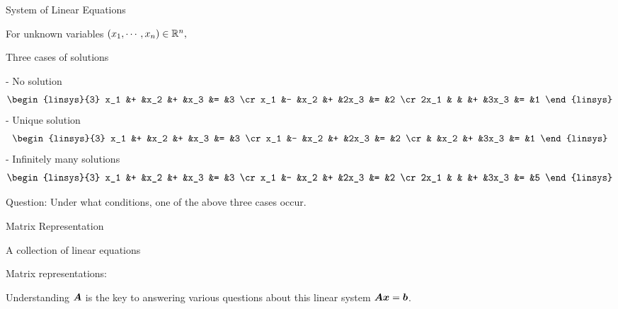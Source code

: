 \documentclass[handout,fleqn,aspectratio=169]{beamer}
\begin{document}
\begin{frame}{System of Linear Equations}

\plitemsep 0.1in


\bci 
\item For unknown variables $(x_1, \cdots, x_n) \in {\mathbb R}^n,$

\item Three cases of solutions

{
- No solution
$$
\begin{linsys}{3}
x_1 &+ &x_2 &+ &x_3 &= &3 \cr
x_1 &- &x_2 &+ &2x_3 &= &2 \cr
2x_1 & & &+ &3x_3 &= &1 
\end{linsys}
$$
}
{
- Unique solution
$$
\begin{linsys}{3}
x_1 &+ &x_2 &+ &x_3 &= &3 \cr
x_1 &- &x_2 &+ &2x_3 &= &2 \cr
 & &x_2 &+ &3x_3 &= &1 
\end{linsys}
$$
}
{
- Infinitely many solutions 
$$
\begin{linsys}{3}
x_1 &+ &x_2 &+ &x_3 &= &3 \cr
x_1 &- &x_2 &+ &2x_3 &= &2 \cr
2x_1 & & &+ &3x_3 &= &5 
\end{linsys}
$$
}
\item Question: Under what conditions, one of the above three cases occur.
\eci
\end{frame}

\begin{frame}{Matrix Representation}

\plitemsep 0.1in

\bci 
\item A collection of linear equations

\item Matrix representations: 
\item Understanding $\bm{A}$ is the key to answering various questions about this linear system $\bm{A}\bm{x} = \bm{b}$.

\eci
\end{frame}
\end{document}
